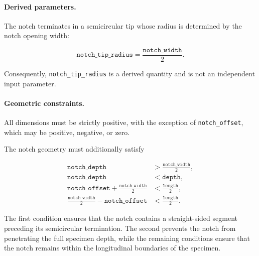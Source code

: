 \paragraph{Derived parameters.}

The notch terminates in a semicircular tip whose
radius is determined by the notch opening width:

\begin{equation}
    \texttt{notch\_tip\_radius}
    = \frac{\texttt{notch\_width}}{2}.
\end{equation}

Consequently, \texttt{notch\_tip\_radius} is a
derived quantity and is not an independent input
parameter.

\paragraph{Geometric constraints.}

All dimensions must be strictly positive, with
the exception of \texttt{notch\_offset}, which
may be positive, negative, or zero.

The notch geometry must additionally satisfy

\begin{align}
    \texttt{notch\_depth}
    &> \frac{\texttt{notch\_width}}{2},
    \\
    \texttt{notch\_depth}
    &< \texttt{depth},
    \\
    \texttt{notch\_offset}
    + \frac{\texttt{notch\_width}}{2}
    &< \frac{\texttt{length}}{2},
    \\
    \frac{\texttt{notch\_width}}{2}
    - \texttt{notch\_offset}
    &< \frac{\texttt{length}}{2}.
\end{align}

The first condition ensures that the notch contains
a straight-sided segment preceding its semicircular
termination. The second prevents the notch from
penetrating the full specimen depth, while the
remaining conditions ensure that the notch remains
within the longitudinal boundaries of the specimen.
